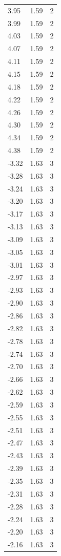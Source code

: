 \begin{longtable}{lrr}
  3.95 & 1.59 & 2 \\
  3.99 & 1.59 & 2 \\
  4.03 & 1.59 & 2 \\
  4.07 & 1.59 & 2 \\
  4.11 & 1.59 & 2 \\
  4.15 & 1.59 & 2 \\
  4.18 & 1.59 & 2 \\
  4.22 & 1.59 & 2 \\
  4.26 & 1.59 & 2 \\
  4.30 & 1.59 & 2 \\
  4.34 & 1.59 & 2 \\
  4.38 & 1.59 & 2 \\
  -3.32 & 1.63 & 3 \\
  -3.28 & 1.63 & 3 \\
  -3.24 & 1.63 & 3 \\
  -3.20 & 1.63 & 3 \\
  -3.17 & 1.63 & 3 \\
  -3.13 & 1.63 & 3 \\
  -3.09 & 1.63 & 3 \\
  -3.05 & 1.63 & 3 \\
  -3.01 & 1.63 & 3 \\
  -2.97 & 1.63 & 3 \\
  -2.93 & 1.63 & 3 \\
  -2.90 & 1.63 & 3 \\
  -2.86 & 1.63 & 3 \\
  -2.82 & 1.63 & 3 \\
  -2.78 & 1.63 & 3 \\
  -2.74 & 1.63 & 3 \\
  -2.70 & 1.63 & 3 \\
  -2.66 & 1.63 & 3 \\
  -2.62 & 1.63 & 3 \\
  -2.59 & 1.63 & 3 \\
  -2.55 & 1.63 & 3 \\
  -2.51 & 1.63 & 3 \\
  -2.47 & 1.63 & 3 \\
  -2.43 & 1.63 & 3 \\
  -2.39 & 1.63 & 3 \\
  -2.35 & 1.63 & 3 \\
  -2.31 & 1.63 & 3 \\
  -2.28 & 1.63 & 3 \\
  -2.24 & 1.63 & 3 \\
  -2.20 & 1.63 & 3 \\
  -2.16 & 1.63 & 3 \\

\end{longtable}
